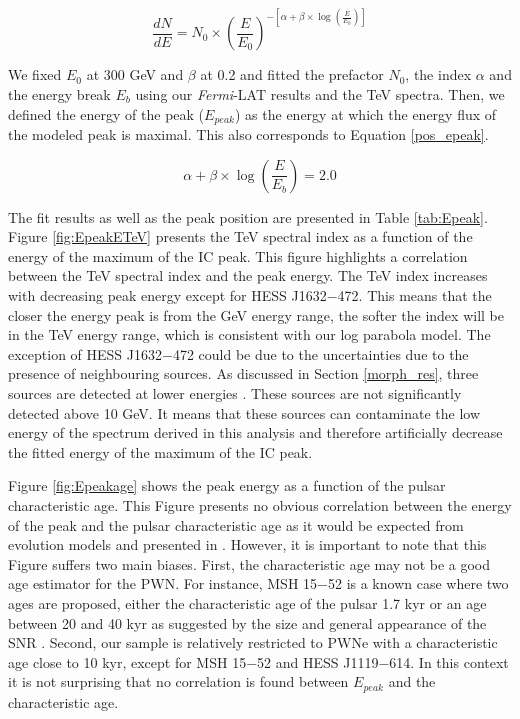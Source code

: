 \begin{equation}
\label{logp}
\frac{dN}{dE}=N_0 \times \left(\frac{E}{E_0}\right)^{-\left[ \alpha + \beta \times \log\left(\frac{E}{E_b}\right) \right]} 
\end{equation}

We fixed $E_0$ at 300 GeV and $\beta$ at 0.2 and fitted the prefactor $N_0$, the index $\alpha$ and the energy break $E_b$ using our \emph{Fermi}-LAT results and the TeV spectra. Then, we defined the energy of the peak ($E_{peak}$) as the energy at which the energy flux of the modeled peak is maximal. This also corresponds to Equation \ref{pos_epeak}.

\begin{equation}
\label{pos_epeak}
\alpha + \beta \times \log\left(\frac{E}{E_b}\right) = 2.0
\end{equation}

The fit results as well as the peak position are presented in Table \ref{tab:Epeak}. Figure \ref{fig:EpeakETeV} presents the TeV spectral index as a function of the energy of the maximum of the IC peak. This figure highlights a correlation between the TeV spectral index and the peak energy. The TeV index increases with decreasing peak energy except for HESS J1632$-$472. This means that the closer the energy peak is from the GeV energy range, the softer the index will be in the TeV energy range, which is consistent with our log parabola model. The exception of HESS J1632$-$472 could be due to the uncertainties due to the presence of neighbouring sources. As discussed in Section \ref{morph_res}, three sources are detected at lower energies \citep{2012ApJS..199...31N}. These sources are not significantly detected above 10 GeV. It means that these sources can contaminate the low energy of the spectrum derived in this analysis and therefore artificially decrease the fitted energy of the maximum of the IC peak.

Figure \ref{fig:Epeakage} shows the peak energy as a function of the pulsar characteristic age. This Figure presents no obvious correlation between the energy of the peak and the pulsar characteristic age as it would be expected from evolution models and presented in \cite{2012arXiv1202.1455M}. However, it is important to note that this Figure suffers two main biases. First, the characteristic age may not be a good age estimator for the PWN. For instance, MSH 15$-$52 is a known case where two ages are proposed, either the characteristic age of the pulsar 1.7 kyr or an age between 20 and 40 kyr as suggested by the size and general appearance of the SNR \citep{2001AA...374..259G}. Second, our sample is relatively restricted to PWNe with a characteristic age close to 10 kyr, except for MSH 15$-$52 and HESS J1119$-$614. In this context it is not surprising that no correlation is found between $E_{peak}$ and the characteristic age. 

